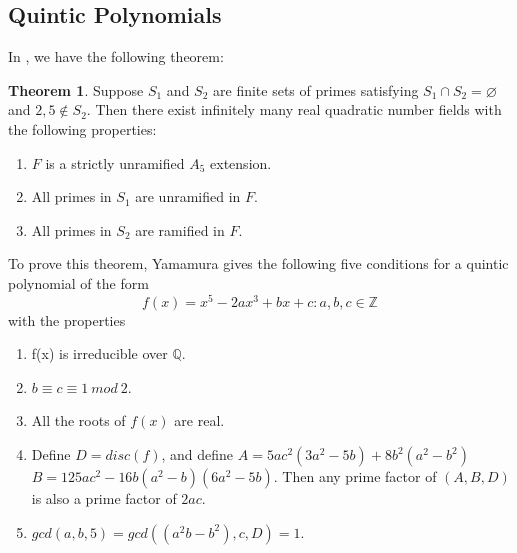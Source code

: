 \documentclass[12pt]{extarticle}
\newcommand{\Q}{\mathbb{Q}}
\newcommand{\Z}{\mathbb{Z}}
\newcommand{\<}{\langle}
\renewcommand{\>}{\rangle}
\renewcommand{\emptyset}{\varnothing}
\theoremstyle{definition}
\newtheorem{theorem}{Theorem}
\begin{document}
\subsection{Quintic Polynomials}
In \cite{yamamura1986}, we have the following theorem:
\begin{theorem}
    Suppose $S_1$ and $S_2$ are finite sets of primes satisfying $S_1 \cap S_2 = \emptyset$ and $2,5 \notin S_2$. Then there exist infinitely many real quadratic number fields with the following properties: \begin{enumerate}
        \item $F$ is a strictly unramified $A_5$ extension.
        \item All primes in $S_1$ are unramified in $F$.
        \item All primes in $S_2$ are ramified in $F$.
    \end{enumerate}
\end{theorem}
To prove this theorem, Yamamura gives the following five conditions for a quintic polynomial of the form \begin{equation}
    f(x)=x^5-2ax^3+bx+c:  a,b,c \in \Z
\end{equation} with the properties
\begin{enumerate}
\item f(x) is irreducible over $\Q$.
\item $b \equiv c \equiv 1 \: mod \: 2  $.
\item All the roots of $f(x)$ are real.
\item Define $D = disc(f)$, and define
$A= 5ac^2(3a^2-5b)+8b^2(a^2-b^2)$
$B = 125ac^2-16b(a^2-b)(6a^2-5b)$.
Then any prime factor of $(A,B,D)$ is also a prime factor of $2ac$. 

\item $gcd(a,b,5) =gcd((a^2b-b^2),c,D)=1$.

\end{enumerate} 
\end{document}
